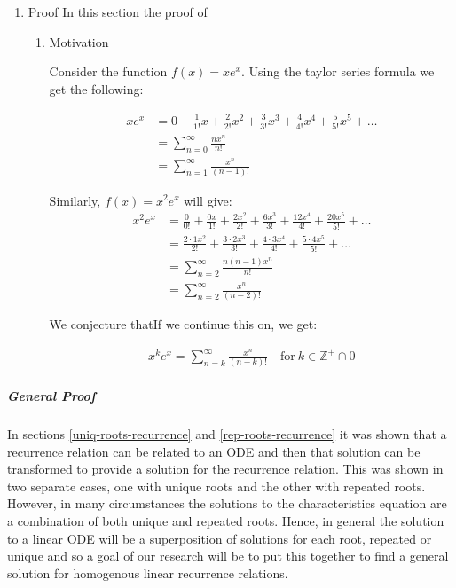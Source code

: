 \documentclass[11pt]{article}
\begin{document}
\begin{enumerate}
\item Proof
\label{prove-general-exp-identity}
In this section the proof of
\begin{enumerate}
\item Motivation
\label{sec:orgc24b4f7}

Consider the function \(f(x) = xe^x\). Using the taylor series formula we get the following:

\begin{align*}
    xe^x &= 0+\frac{1}{1!}x+\frac{2}{2!}x^2+\frac{3}{3!}x^3+\frac{4}{4!}x^4+\frac{5}{5!}x^5+\dots\\
    &= \sum_{n=0}^\infty \frac{nx^n}{n!}\\
    &= \sum_{n=1}^\infty \frac{x^n}{(n-1)!}
\end{align*}

Similarly, \(f(x) = x^2e^x\) will give:
\begin{align*}
    x^2e^x &= \frac{0}{0!} + \frac{0x}{1!} + \frac{2x^2}{2!} + \frac{6x^3}{3!} + \frac{12x^4}{4!} + \frac{20x^5}{5!} + \dots\\
    &= \frac{2\cdot 1x^2}{2!} + \frac{3\cdot 2 x^3}{3!} + \frac{4\cdot 3x^4}{4!} + \frac{5\cdot 4 x^5}{5!} + \dots\\
    &= \sum_{n=2}^\infty \frac{n(n-1)x^n}{n!}\\
    &= \sum_{n=2}^\infty \frac{x^n}{(n-2)!}
\end{align*}

We conjecture thatIf we continue this on, we get:

\begin{align*}
    x^ke^x = \sum_{n=k}^\infty \frac{x^n}{(n-k)!} \quad \text{for}~k\in \mathbb{Z^{+}}\cap0
\end{align*}
\end{enumerate}
\end{enumerate}

\subparagraph{General Proof}
\label{general-gen-func-proof}
In sections \ref{uniq-roots-recurrence} and \ref{rep-roots-recurrence}
it was shown that a recurrence relation can be related to an ODE and then that
solution can be transformed to provide a solution for the recurrence relation.
This was shown in two separate cases, one with unique roots and the other with
repeated roots. However, in many circumstances the solutions to the characteristics
equation are a combination of both unique and repeated roots. Hence, in general the
solution to a linear ODE will be a superposition of solutions for each root, repeated
or unique and so a goal of our research will be to put this together to find a general
solution for homogenous linear recurrence relations.
\end{document}
